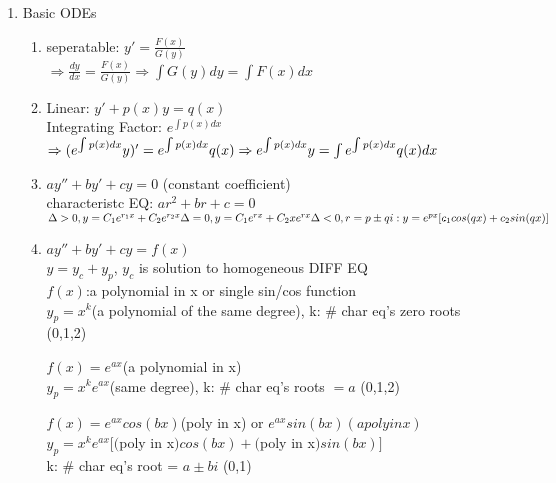 \documentclass[10pt]{article}
\begin{document}
  
\begin{multicols}{2}
	
\begin{enumerate}
	\item Basic ODEs
	\begin{enumerate}
		\item seperatable: $y'= \frac{F(x)}{G(y)}$\\
		$\Rightarrow \frac{dy}{dx} = \frac{F(x)}{G(y)} \Rightarrow \int G(y)dy = \int F(x)dx$
		
		\item Linear: $y'+p(x)y = q(x)$\\
		Integrating Factor: $e^{\int p(x)dx}$\\
		$\Rightarrow (e^{\int p(x)dx}y)' = e^{\int p(x)dx}q(x)\\ \Rightarrow
		e^{\int p(x)dx}y = \int e^{\int p(x)dx}q(x)dx$
		
		\item $ay'' + by' + cy = 0$ (constant coefficient)\\
		characteristc EQ: $ar^2 + br + c = 0$\\
		$\Delta > 0, y = C_1e^{r_1x} + C_2e^{r_2x}\\
		\Delta = 0, y = C_1e^{rx} + C_2xe^{rx}\\
		\Delta < 0, r = p \pm qi: y = e^{px}[c_1cos(qx)+c_2sin(qx)]$
		
		\item $ay'' + by' + cy = f(x)$ \\
		$y = y_c + y_p$, $y_c$ is solution to homogeneous DIFF EQ\\
		$f(x)$:a polynomial in x or single sin/cos function\\
		$y_p =  x^k$(a polynomial of the same degree), k: $\#$ char eq's zero roots (0,1,2)
		
		$f(x) = e^{ax}$(a polynomial in x)\\
		$y_p =  x^ke^{ax}$(same degree), k: $\#$ char eq's roots $= a$ (0,1,2)
		
		$f(x) = e^{ax}cos(bx)$(poly in x) or $e^{ax}sin(bx)(a poly in x)$\\
		$y_p = x^ke^{ax} [ ($poly in x$)cos(bx) + ($poly in x$)sin(bx) ]$\\
		k: $\#$ char eq's root = $a \pm bi$ (0,1)
	\end{enumerate}




\end{enumerate}
\end{multicols}
\end{document}
